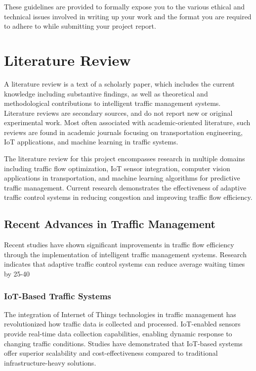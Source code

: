 \documentclass[12pt]{report}
\begin{document}
These guidelines are provided to formally expose you to the various ethical and technical issues involved in writing up your work and the format you are required to adhere to while submitting your project report.

\section[Literature Review]{\textbf{Literature Review}}

A literature review is a text of a scholarly paper, which includes the current knowledge including substantive findings, as well as theoretical and methodological contributions to intelligent traffic management systems. Literature reviews are secondary sources, and do not report new or original experimental work. Most often associated with academic-oriented literature, such reviews are found in academic journals focusing on transportation engineering, IoT applications, and machine learning in traffic systems.

The literature review for this project encompasses research in multiple domains including traffic flow optimization, IoT sensor integration, computer vision applications in transportation, and machine learning algorithms for predictive traffic management. Current research demonstrates the effectiveness of adaptive traffic control systems in reducing congestion and improving traffic flow efficiency.

\subsection{Recent Advances in Traffic Management}
Recent studies have shown significant improvements in traffic flow efficiency through the implementation of intelligent traffic management systems. Research indicates that adaptive traffic control systems can reduce average waiting times by 25-40%

\subsubsection[IoT-Based Traffic Systems]{\textbf{IoT-Based Traffic Systems}}

The integration of Internet of Things technologies in traffic management has revolutionized how traffic data is collected and processed. IoT-enabled sensors provide real-time data collection capabilities, enabling dynamic response to changing traffic conditions. Studies have demonstrated that IoT-based systems offer superior scalability and cost-effectiveness compared to traditional infrastructure-heavy solutions.
\end{document}
